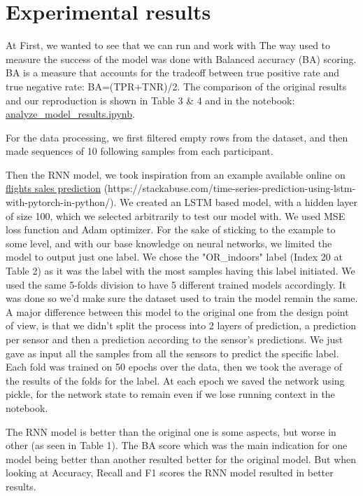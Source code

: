 \documentclass{article}
\begin{document}
\section{Experimental results}
 At First, we wanted to see that we can run and work with\newline
 The way used to measure the success of the model was done with Balanced accuracy (BA) scoring.
 BA is a measure that accounts for the tradeoff between true positive rate and true negative rate: BA=(TPR+TNR)/2.
The comparison of the original results and our reproduction is shown in Table 3 \& 4 and in the notebook: \href{https://colab.research.google.com/drive/18adUIvkYi8E6JQyZsbEtx6wgEXZr3hnX#scrollTo=cweKasXbbpH6}{analyze\_model\_results.ipynb}.\par
 
 For the data processing, we first filtered empty rows from the dataset, and then made sequences of 10 following samples from each participant.\par
 Then the RNN model, we took inspiration from an example available online on \href{https://stackabuse.com/time-series-prediction-using-lstm-with-pytorch-in-python/}{flights sales prediction} (https://stackabuse.com/time-series-prediction-using-lstm-with-pytorch-in-python/). We created an LSTM based model, with a hidden layer of size 100, which we selected arbitrarily to test our model with. We used MSE loss function and Adam optimizer. For the sake of sticking to the example to some level, and with our base knowledge on neural networks, we limited the model to output just one label. We chose the "OR\_indoors" label (Index 20 at Table 2) as it was the label with the most samples having this label initiated. We used the same 5-folds division to have 5 different trained models accordingly. It was done so we'd make sure the dataset used to train the model remain the same. A major difference between this model to the original one from the design point of view, is that we didn't split the process into 2 layers of prediction, a prediction per sensor and then a prediction according to the sensor's predictions. We just gave as input all the samples from all the sensors to  predict the specific label. Each fold was trained on 50 epochs over the data, then we took the average of the results of the folds for the label. At each epoch we saved the network using pickle, for the network state to remain even if we lose running context in the notebook.\par
 The RNN model is better than the original one is some aspects, but worse in other (as seen in Table 1). The BA score which was the main indication for one model being better than another resulted better for the original model. But when looking at Accuracy, Recall and F1 scores the RNN model resulted in better results.
\end{document}
